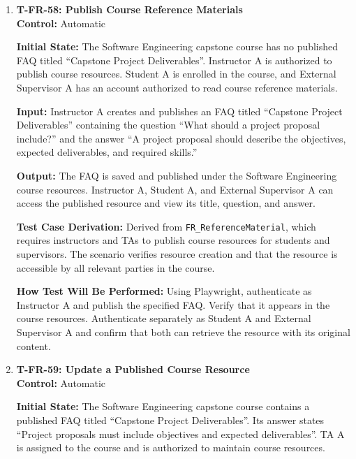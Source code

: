 \documentclass[12pt, titlepage]{article}
\begin{document}
\begin{enumerate}
\textbf{How Test Will Be Performed:} Configure the course with one pending team-project approval. Using Playwright, authenticate as Instructor A and attempt to disable the approval feature. Verify the error message and displayed pending submission. Confirm that the component remains enabled and the submission is unchanged.

\item \label{T-FR-58}\textbf{T-FR-58: Publish Course Reference Materials}\\

\textbf{Control:} Automatic

\textbf{Initial State:} The Software Engineering capstone course has no published FAQ titled ``Capstone Project Deliverables''. Instructor A is authorized to publish course resources. Student A is enrolled in the course, and External Supervisor A has an account authorized to read course reference materials.

\textbf{Input:} Instructor A creates and publishes an FAQ titled ``Capstone Project Deliverables'' containing the question ``What should a project proposal include?'' and the answer ``A project proposal should describe the objectives, expected deliverables, and required skills.''

\textbf{Output:} The FAQ is saved and published under the Software Engineering course resources. Instructor A, Student A, and External Supervisor A can access the published resource and view its title, question, and answer.

\textbf{Test Case Derivation:} Derived from \texttt{FR\_ReferenceMaterial}, which requires instructors and TAs to publish course resources for students and supervisors. The scenario verifies resource creation and that the resource is accessible by all relevant parties in the course.

\textbf{How Test Will Be Performed:} Using Playwright, authenticate as Instructor A and publish the specified FAQ. Verify that it appears in the course resources. Authenticate separately as Student A and External Supervisor A and confirm that both can retrieve the resource with its original content.

\item \label{T-FR-59}\textbf{T-FR-59: Update a Published Course Resource}\\

\textbf{Control:} Automatic

\textbf{Initial State:} The Software Engineering capstone course contains a published FAQ titled ``Capstone Project Deliverables''. Its answer states ``Project proposals must include objectives and expected deliverables''. TA A is assigned to the course and is authorized to maintain course resources.


\end{enumerate}
\end{document}
